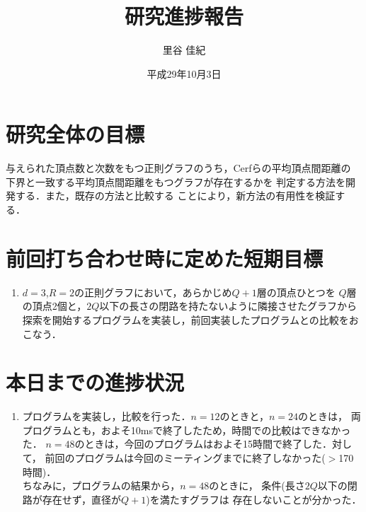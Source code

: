 \documentclass[11pt]{jarticle}
\title{研究進捗報告}
\author{里谷 佳紀}
\date{平成29年10月3日}
\begin{document}
%
\maketitle
\thispagestyle{empty}
%
\section{研究全体の目標}
与えられた頂点数と次数をもつ正則グラフのうち，Cerfらの平均頂点間距離の
下界\cite{Cerf1974}と一致する平均頂点間距離をもつグラフが存在するかを
判定する方法を開発する．また，既存の方法\cite{Yamamoto2016}と比較する
ことにより，新方法の有用性を検証する．

\section{前回打ち合わせ時に定めた短期目標}
\begin{enumerate}
\item $d=3$,$R=2$の正則グラフにおいて，あらかじめ$Q+1$層の頂点ひとつを
  $Q$層の頂点2個と，$2Q$以下の長さの閉路を持たないように隣接させたグラフから
  探索を開始するプログラムを実装し，前回実装したプログラムとの比較をおこなう．
\end{enumerate}

\section{本日までの進捗状況}
\begin{enumerate}
\item プログラムを実装し，比較を行った．$n=12$のときと，$n=24$のときは，
  両プログラムとも，およそ10msで終了したため，時間での比較はできなかった．
  $n=48$のときは，今回のプログラムはおよそ15時間で終了した．対して，
  前回のプログラムは今回のミーティングまでに終了しなかった($>$170時間)． \\
  ちなみに，プログラムの結果から，$n=48$のときに，
  条件(長さ$2Q$以下の閉路が存在せず，直径が$Q+1$)を満たすグラフは
  存在しないことが分かった． \\
\end{enumerate}






\end{document}
